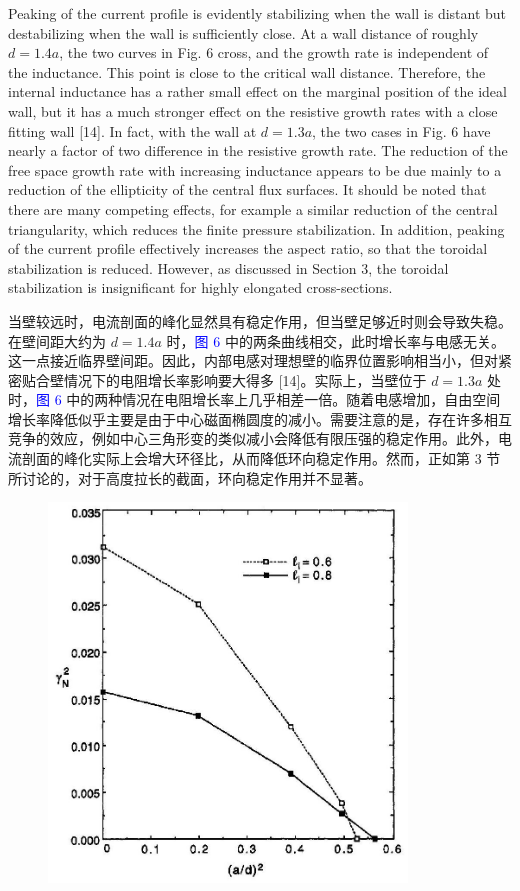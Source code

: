 \documentclass[utf8]{ctexart}
\newcommand\enzhbox[2]{
  	\quad\par \begin{paracol}{2} \colseprulecolor{black} 
  		\begin{spacing}{1.0}
  			\footnotesize  #1
  		\end{spacing}
  		\switchcolumn[1] 
  		#2
  	\end{paracol} \quad\par
  }
\begin{document}
\begin{sloppypar}
 
\enzhbox{  Peaking of the current profile is evidently stabilizing when the wall is distant but destabilizing when the wall is sufficiently close. At a wall distance of roughly $d=1.4 a$, the two curves in Fig. 6 cross, and the growth rate is independent of the inductance. This point is close to the critical wall distance. Therefore, the internal inductance has a rather small effect on the marginal position of the ideal wall, but it has a much stronger effect on the resistive growth rates with a close fitting wall \textcolor{green!50!black}{[14]}. In fact, with the wall at $d=1.3 a$, the two cases in Fig. 6 have nearly a factor of two difference in the resistive growth rate. The reduction of the free space growth rate with increasing inductance appears to be due mainly to a reduction of the ellipticity of the central flux surfaces. It should be noted that there are many competing effects, for example a similar reduction of the central triangularity, which reduces the finite pressure stabilization. In addition, peaking of the current profile effectively increases the aspect ratio, so that the toroidal stabilization is reduced. However, as discussed in Section 3, the toroidal stabilization is insignificant for highly elongated cross-sections.}{
当壁较远时，电流剖面的峰化显然具有稳定作用，但当壁足够近时则会导致失稳。在壁间距大约为 $d = 1.4a$ 时，\textcolor{blue}{图 6} 中的两条曲线相交，此时增长率与电感无关。这一点接近临界壁间距。因此，内部电感对理想壁的临界位置影响相当小，但对紧密贴合壁情况下的电阻增长率影响要大得多 \textcolor{green!50!black}{[14]}。实际上，当壁位于 $d = 1.3a$ 处时，\textcolor{blue}{图 6} 中的两种情况在电阻增长率上几乎相差一倍。随着电感增加，自由空间增长率降低似乎主要是由于中心磁面椭圆度的减小。需要注意的是，存在许多相互竞争的效应，例如中心三角形变的类似减小会降低有限压强的稳定作用。此外，电流剖面的峰化实际上会增大环径比，从而降低环向稳定作用。然而，正如第 3 节所讨论的，对于高度拉长的截面，环向稳定作用并不显著。 }
  \begin{figure}[H]
  	\centering
  	\includegraphics[max width=0.85\textwidth,max height=0.3\textheight]{2025_01_10_a0135324997886412d98g-7}

\end{figure}
\end{sloppypar}
\end{document}
